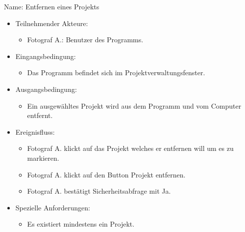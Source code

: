 \begin{itemize}
		Name: Entfernen eines Projekts
		\begin{itemize}
			\item Teilnehmender Akteure:
			\begin{itemize}
				\item	Fotograf A.: Benutzer des Programms.	
			\end{itemize}
			\item Eingangsbedingung:
			\begin{itemize}
				\item	Das Programm befindet sich im Projektverwaltungsfenster.		
			\end{itemize}
			\item Ausgangsbedingung:
			\begin{itemize}
				\item	Ein ausgewähltes Projekt wird aus dem Programm und vom Computer entfernt.		
			\end{itemize}
			\item Ereignisfluss:
			\begin{itemize}
				\item Fotograf A. klickt auf das Projekt welches er entfernen will um es zu markieren.
				\item Fotograf A. klickt auf den Button Projekt entfernen.
				\item Fotograf A.	bestätigt Sicherheitsabfrage mit Ja.				
			\end{itemize}
			\item Spezielle Anforderungen:
			\begin{itemize}
				\item	Es existiert mindestens ein Projekt.		
			\end{itemize}			
		\end{itemize}
		

\end{itemize}
